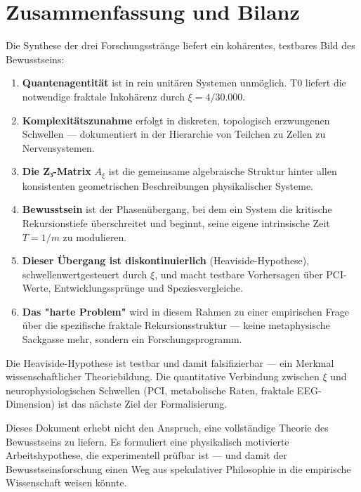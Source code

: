 \documentclass[11pt,a4paper]{article}
\begin{document}
	\section{Zusammenfassung und Bilanz}
	
	Die Synthese der drei Forschungsstränge liefert ein kohärentes, testbares Bild des Bewusstseins:
	
	\begin{enumerate}
		\item \textbf{Quantenagentität} ist in rein unitären Systemen unmöglich. T0 liefert die notwendige fraktale Inkohärenz durch \(\xi = 4/30.000\).
		
		\item \textbf{Komplexitätszunahme} erfolgt in diskreten, topologisch erzwungenen Schwellen — dokumentiert in der Hierarchie von Teilchen zu Zellen zu Nervensystemen.
		
		\item \textbf{Die Z₃-Matrix} \(A_\xi\) ist die gemeinsame algebraische Struktur hinter allen konsistenten geometrischen Beschreibungen physikalischer Systeme.
		
		\item \textbf{Bewusstsein} ist der Phasenübergang, bei dem ein System die kritische Rekursionstiefe überschreitet und beginnt, seine eigene intrinsische Zeit \(T = 1/m\) zu modulieren.
		
		\item \textbf{Dieser Übergang ist diskontinuierlich} (Heaviside-Hypothese), schwellenwertgesteuert durch \(\xi\), und macht testbare Vorhersagen über PCI-Werte, Entwicklungssprünge und Speziesvergleiche.
		
		\item \textbf{Das "harte Problem"} wird in diesem Rahmen zu einer empirischen Frage über die spezifische fraktale Rekursionsstruktur — keine metaphysische Sackgasse mehr, sondern ein Forschungsprogramm.
	\end{enumerate}
	
	\begin{conclusionBox}[Bilanz]
		Die Heaviside-Hypothese ist testbar und damit falsifizierbar — ein Merkmal wissenschaftlicher Theoriebildung. Die quantitative Verbindung zwischen \(\xi\) und neurophysiologischen Schwellen (PCI, metabolische Raten, fraktale EEG-Dimension) ist das nächste Ziel der Formalisierung.
		
		Dieses Dokument erhebt nicht den Anspruch, eine vollständige Theorie des Bewusstseins zu liefern. Es formuliert eine physikalisch motivierte Arbeitshypothese, die experimentell prüfbar ist — und damit der Bewusstseinsforschung einen Weg aus spekulativer Philosophie in die empirische Wissenschaft weisen könnte.
	\end{conclusionBox}
	
\end{document}

